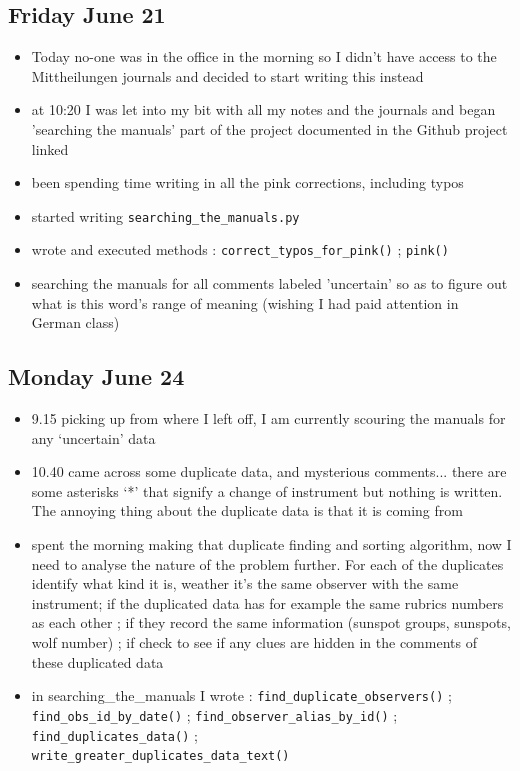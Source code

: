 \documentclass[12pt]{article}
\begin{document}
\subsection{Friday June 21}
\begin{itemize}
    \item Today no-one was in the office in the morning so I didn't have access to the Mittheilungen journals and decided to start writing this instead
    \item at 10:20 I was let into my bit with all my notes and the journals and began 'searching the manuals' part of the project documented in the Github project linked
    \item been spending time writing in all the pink corrections, including typos
    \item started writing \texttt{searching\_the\_manuals.py}
    \item wrote and executed methods : \texttt{correct\_typos\_for\_pink()} ; \texttt{pink()}
    \item searching the manuals for all comments labeled 'uncertain' so as to figure out what is this word's range of meaning (wishing I had paid attention in German class)
\end{itemize}
    
\subsection{Monday June 24}
\begin{itemize}
    \item 9.15 picking up from where I left off, I am currently scouring the manuals for any `uncertain' data
    \item 10.40 came across some duplicate data, and mysterious comments... there are some asterisks `*' that signify a change of instrument but nothing is written. The annoying thing about the duplicate data is that it is coming from 
    \item spent the morning making that duplicate finding and sorting algorithm, now I need to analyse the nature of the problem further. For each of the duplicates identify what kind it is, weather it's the same observer with the same instrument; if the duplicated data has for example the same rubrics numbers as each other ; if they record the same information (sunspot groups, sunspots, wolf number) ; if check to see if any clues are hidden in the comments of these duplicated data
    \item in searching\_the\_manuals I wrote : \texttt{find\_duplicate\_observers()} ;\\ \texttt{find\_obs\_id\_by\_date()} ; \texttt{find\_observer\_alias\_by\_id()} ; \texttt{find\_duplicates\_data()} ;\\ \texttt{write\_greater\_duplicates\_data\_text()}
\end{itemize}
    
\end{document}
